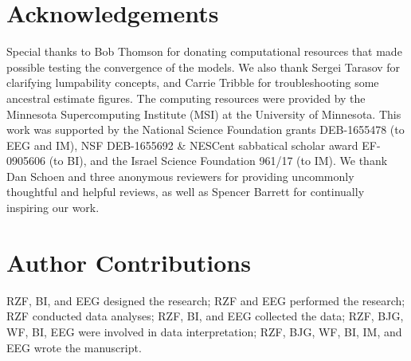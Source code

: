 \documentclass[11pt]{article}
\begin{document}
\section{Acknowledgements}
Special thanks to Bob Thomson for donating computational resources that made possible testing the convergence of the models. 
We also thank Sergei Tarasov for clarifying lumpability concepts, and Carrie Tribble for troubleshooting some ancestral estimate figures. 
The computing resources were provided by the Minnesota Supercomputing Institute (MSI) at the University of Minnesota.
This work was supported by the National Science Foundation grants DEB-1655478 (to EEG and IM), NSF DEB-1655692 \& NESCent sabbatical scholar award EF-0905606 (to BI), and the Israel Science Foundation 961/17 (to IM). %
We thank Dan Schoen and three anonymous reviewers for providing uncommonly thoughtful and helpful reviews, as well as Spencer Barrett for continually inspiring our work.

\section{Author Contributions}

RZF, BI, and EEG designed the research; RZF and EEG performed the research; RZF conducted data analyses; RZF, BI, and EEG collected the data; RZF, BJG, WF, BI, EEG were involved in data interpretation; RZF, BJG, WF, BI, IM, and EEG wrote the manuscript.


\clearpage



\setstretch{\stretchby}
\end{document}
